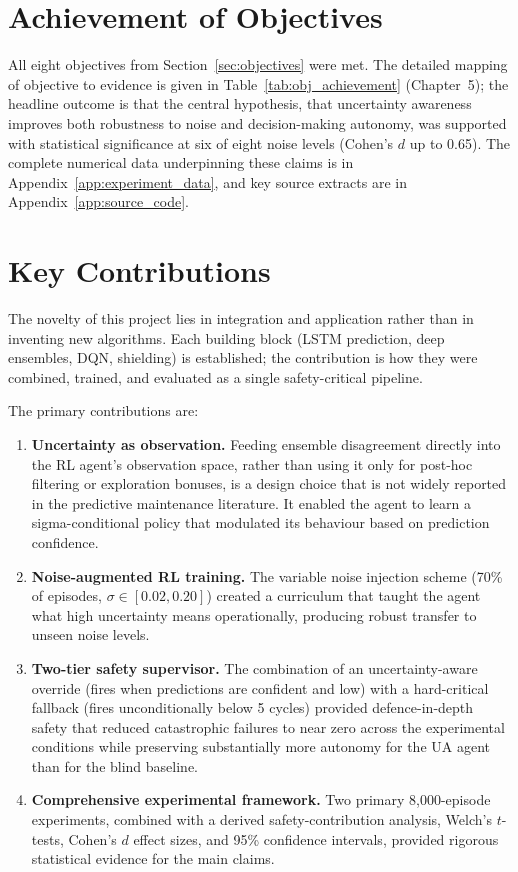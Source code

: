 \documentclass[12pt,a4paper]{report}
\begin{document}
\section{Achievement of Objectives}

All eight objectives from Section~\ref{sec:objectives} were met. The detailed mapping of objective to evidence is given in Table~\ref{tab:obj_achievement} (Chapter~5); the headline outcome is that the central hypothesis, that uncertainty awareness improves both robustness to noise and decision-making autonomy, was supported with statistical significance at six of eight noise levels (Cohen's $d$ up to 0.65). The complete numerical data underpinning these claims is in Appendix~\ref{app:experiment_data}, and key source extracts are in Appendix~\ref{app:source_code}.

\section{Key Contributions}

The novelty of this project lies in integration and application rather than in inventing new algorithms. Each building block (LSTM prediction, deep ensembles, DQN, shielding) is established; the contribution is how they were combined, trained, and evaluated as a single safety-critical pipeline.

The primary contributions are:

\begin{enumerate}
    \item \textbf{Uncertainty as observation.} Feeding ensemble disagreement directly into the RL agent's observation space, rather than using it only for post-hoc filtering or exploration bonuses, is a design choice that is not widely reported in the predictive maintenance literature. It enabled the agent to learn a sigma-conditional policy that modulated its behaviour based on prediction confidence.
    \item \textbf{Noise-augmented RL training.} The variable noise injection scheme (70\% of episodes, $\sigma \in [0.02, 0.20]$) created a curriculum that taught the agent what high uncertainty means operationally, producing robust transfer to unseen noise levels.
    \item \textbf{Two-tier safety supervisor.} The combination of an uncertainty-aware override (fires when predictions are confident and low) with a hard-critical fallback (fires unconditionally below 5 cycles) provided defence-in-depth safety that reduced catastrophic failures to near zero across the experimental conditions while preserving substantially more autonomy for the UA agent than for the blind baseline.
    \item \textbf{Comprehensive experimental framework.} Two primary 8,000-episode experiments, combined with a derived safety-contribution analysis, Welch's $t$-tests, Cohen's $d$ effect sizes, and 95\% confidence intervals, provided rigorous statistical evidence for the main claims.
\end{enumerate}
\end{document}
